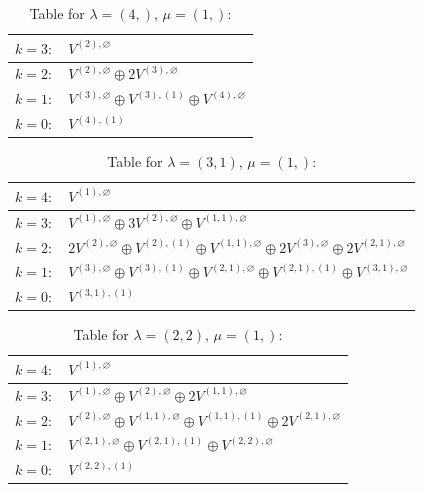 \documentclass[a4paper,12pt]{article}
\begin{document}
\renewcommand{\arraystretch}{1.6} 
\begin{table}[H]
\centering
\caption{Table for $\lambda = (4,)$, $\mu = (1,)$:}
\begin{tabular}{|>{\centering\arraybackslash}p{15cm}|}
\hline
 $k = 3: \quad V^{(2), \varnothing} $ \\ \hline
 $k = 2: \quad V^{(2), \varnothing} \oplus 2 V^{(3), \varnothing} $ \\ \hline
 $k = 1: \quad V^{(3), \varnothing} \oplus V^{(3), (1)} \oplus V^{(4), \varnothing} $ \\ \hline
 $k = 0: \quad V^{(4), (1)} $ \\ \hline
\end{tabular}
\end{table}

\renewcommand{\arraystretch}{1.6} 
\begin{table}[H]
\centering
\caption{Table for $\lambda = (3, 1)$, $\mu = (1,)$:}
\begin{tabular}{|>{\centering\arraybackslash}p{15cm}|}
\hline
 $k = 4: \quad V^{(1), \varnothing} $ \\ \hline
 $k = 3: \quad V^{(1), \varnothing} \oplus 3 V^{(2), \varnothing} \oplus V^{(1, 1), \varnothing} $ \\ \hline
 $k = 2: \quad 2 V^{(2), \varnothing} \oplus V^{(2), (1)} \oplus V^{(1, 1), \varnothing} \oplus 2 V^{(3), \varnothing} \oplus 2 V^{(2, 1), \varnothing} $ \\ \hline
 $k = 1: \quad V^{(3), \varnothing} \oplus V^{(3), (1)} \oplus V^{(2, 1), \varnothing} \oplus V^{(2, 1), (1)} \oplus V^{(3, 1), \varnothing} $ \\ \hline
 $k = 0: \quad V^{(3, 1), (1)} $ \\ \hline
\end{tabular}
\end{table}

\renewcommand{\arraystretch}{1.6} 
\begin{table}[H]
\centering
\caption{Table for $\lambda = (2, 2)$, $\mu = (1,)$:}
\begin{tabular}{|>{\centering\arraybackslash}p{15cm}|}
\hline
 $k = 4: \quad V^{(1), \varnothing} $ \\ \hline
 $k = 3: \quad V^{(1), \varnothing} \oplus V^{(2), \varnothing} \oplus 2 V^{(1, 1), \varnothing} $ \\ \hline
 $k = 2: \quad V^{(2), \varnothing} \oplus V^{(1, 1), \varnothing} \oplus V^{(1, 1), (1)} \oplus 2 V^{(2, 1), \varnothing} $ \\ \hline
 $k = 1: \quad V^{(2, 1), \varnothing} \oplus V^{(2, 1), (1)} \oplus V^{(2, 2), \varnothing} $ \\ \hline
 $k = 0: \quad V^{(2, 2), (1)} $ \\ \hline
\end{tabular}
\end{table}
\end{document}
